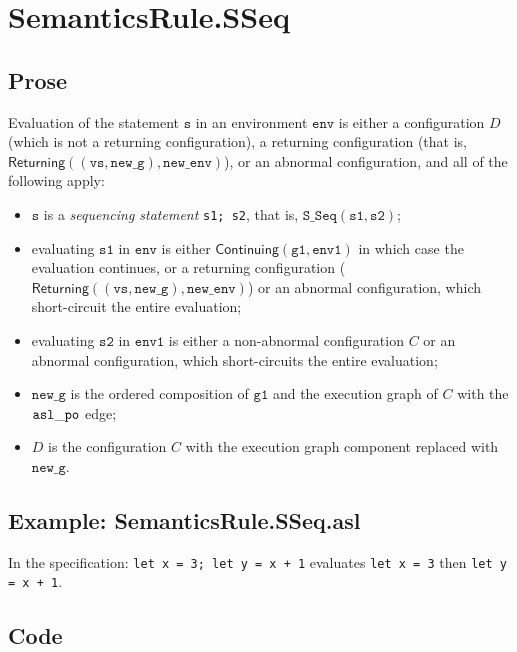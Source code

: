 \documentclass{book}
\newcommand\ProseOrAbnormal[0]{or an abnormal configuration, which short-circuits the entire evaluation}
\newcommand\Continuing[0]{\textsf{Continuing}}
\newcommand\Returning[0]{\textsf{Returning}}
\newcommand\newenv[0]{\texttt{new\_env}}
\newcommand\env[0]{\texttt{env}}
\newcommand\envone[0]{\texttt{env1}}
\newcommand\newg[0]{\texttt{new\_g}}
\newcommand\vs[0]{\texttt{s}}
\newcommand\vvs[0]{\texttt{vs}}
\newcommand\vsone[0]{\texttt{s1}}
\newcommand\vstwo[0]{\texttt{s2}}
\newcommand\vgone[0]{\texttt{g1}}
\begin{document}
\section{SemanticsRule.SSeq \label{sec:SemanticsRule.SSeq}}
  \subsection{Prose}
  Evaluation of the statement $\vs$ in an environment $\env$ is
  either a configuration $D$ (which is not a returning configuration),
  a returning configuration (that is, \\ $\Returning((\vvs, \newg), \newenv)$),
  or an abnormal configuration,
  and all of the following apply:
  \begin{itemize}
    \item $\vs$ is a \emph{sequencing statement} \texttt{s1; s2}, that is, $\texttt{S\_Seq}(\vsone, \vstwo)$;
    \item evaluating $\vsone$ in $\env$ is either $\Continuing(\vgone, \envone)$ in which case
    the evaluation continues,
    or a returning configuration ($\Returning((\vvs, \newg), \newenv)$) or an abnormal configuration,
    which short-circuit the entire evaluation;
    \item evaluating $\vstwo$ in $\envone$ is either a non-abnormal configuration $C$
    \ProseOrAbnormal;
    \item $\newg$ is the ordered composition of $\vgone$ and the execution graph of $C$ with the
    $\mathtt{asl\_po}$ edge;
    \item $D$ is the configuration $C$ with the execution graph component replaced with $\newg$.
  \end{itemize}

  \subsection{Example: SemanticsRule.SSeq.asl}
  In the specification:
  \texttt{let x = 3; let y = x + 1} evaluates \texttt{let x = 3} then \texttt{let y = x + 1}.

  \subsection{Code}
\end{document}
